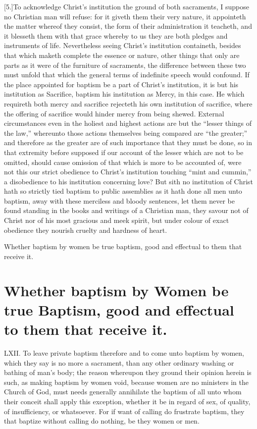 [5.]To acknowledge Christ’s institution the ground of both sacraments, I suppose no Christian man will refuse: for it giveth them their very nature, it appointeth the matter whereof they consist, the form of their administration it teacheth, and it blesseth them with that grace whereby to us they are both pledges and instruments of life. Nevertheless seeing Christ’s institution containeth, besides that which maketh complete the essence or nature, other things that only are parts as it were of the furniture of sacraments, the difference between these two must unfold that which the general terms of indefinite speech would confound. If the place appointed for baptism be a part of Christ’s institution, it is but his institution as Sacrifice, baptism his institution as Mercy, in this case. He which requireth both mercy and sacrifice rejecteth his own institution of sacrifice, where the offering of sacrifice would hinder mercy from being shewed. External circumstances even in the holiest and highest actions are but the “lesser things of the law,” whereunto those actions themselves being compared are “the greater;” and therefore as the greater are of such importance that they must be done, so in that extremity before supposed if our account of the lesser which are not to be omitted, should cause omission of that which is more to be accounted of, were not this our strict obedience to Christ’s institution touching “mint and cummin,” a disobedience to his institution concerning love? But sith no institution of Christ hath so strictly tied baptism to public assemblies as it hath done all men unto baptism, away with these merciless and bloody sentences, let them never be found standing in the books and writings of a Christian man, they savour not of Christ nor of his most gracious and meek spirit, but under colour of exact obedience they nourish cruelty and hardness of heart.


Whether baptism by women be true baptism, good and effectual to them that receive it.
\section*{Whether baptism by Women be true Baptism, good and effectual to them that receive it.}
LXII. To leave private baptism therefore and to come unto baptism by women, which they say is no more a  sacrament, than any other ordinary washing or bathing of man’s body; the reason whereupon they ground their opinion herein is such, as making baptism by women void, because women are no ministers in the Church of God, must needs generally annihilate the baptism of all unto whom their conceit shall apply this exception, whether it be in regard of sex, of quality, of insufficiency, or whatsoever.
 For if want of calling do frustrate baptism, they that baptize without calling do nothing, be they women or men.

